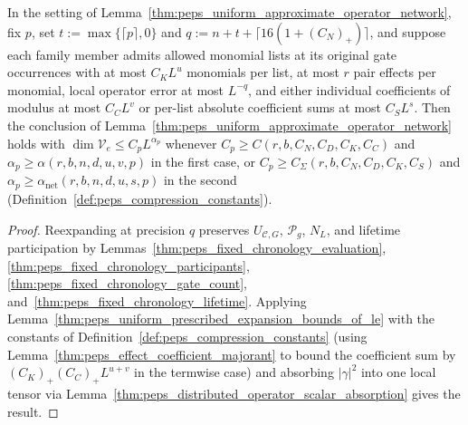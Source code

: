 \begin{lemma}
    \label{thm:peps_uniform_approximate_operator_network_of_le}
    \leanok
    In the setting of Lemma~\ref{thm:peps_uniform_approximate_operator_network}, fix $p$, set $t:=\max\{\lceil p\rceil,0\}$ and $q:=n+t+\lceil16(1+(C_N)_+)\rceil$, and suppose each family member admits allowed monomial lists at its original gate occurrences with at most $C_KL^u$ monomials per list, at most $r$ pair effects per monomial, local operator error at most $L^{-q}$, and either individual coefficients of modulus at most $C_CL^v$ or per-list absolute coefficient sums at most $C_SL^s$. Then the conclusion of Lemma~\ref{thm:peps_uniform_approximate_operator_network} holds with $\dim\mathcal V_e\le C_pL^{\alpha_p}$ whenever $C_p\ge C(r,b,C_N,C_D,C_K,C_C)$ and $\alpha_p\ge\alpha(r,b,n,d,u,v,p)$ in the first case, or $C_p\ge C_\Sigma(r,b,C_N,C_D,C_K,C_S)$ and $\alpha_p\ge\alpha_{\mathrm{net}}(r,b,n,d,u,s,p)$ in the second (Definition~\ref{def:peps_compression_constants}).
\end{lemma}
\begin{proof}
    \leanok
    Reexpanding at precision $q$ preserves $U_{\mathcal C,G}$, $\mathcal P_g$, $N_L$, and lifetime participation by Lemmas~\ref{thm:peps_fixed_chronology_evaluation}, \ref{thm:peps_fixed_chronology_participants}, \ref{thm:peps_fixed_chronology_gate_count}, and~\ref{thm:peps_fixed_chronology_lifetime}. Applying Lemma~\ref{thm:peps_uniform_prescribed_expansion_bounds_of_le} with the constants of Definition~\ref{def:peps_compression_constants} (using Lemma~\ref{thm:peps_effect_coefficient_majorant} to bound the coefficient sum by $(C_K)_+(C_C)_+L^{u+v}$ in the termwise case) and absorbing $|\gamma|^2$ into one local tensor via Lemma~\ref{thm:peps_distributed_operator_scalar_absorption} gives the result.
\end{proof}

